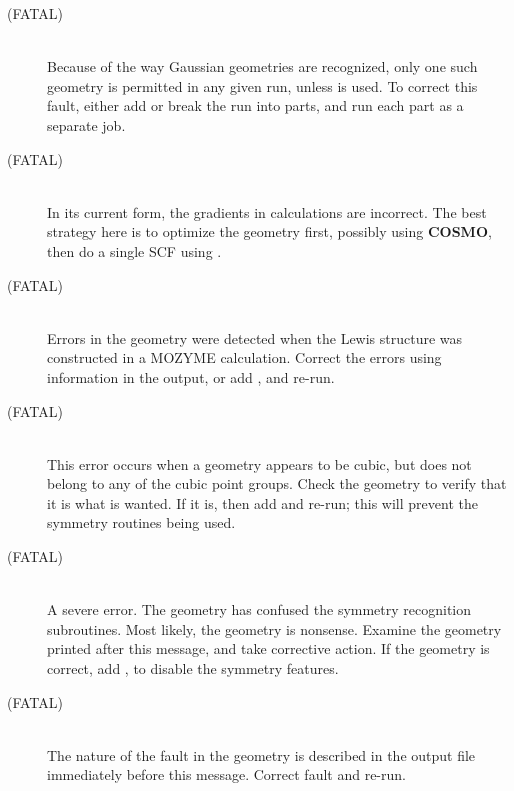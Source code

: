 \begin{description}
\item[ (FATAL)]~\\
Because of the way Gaussian geometries are recognized, only one such geometry
is permitted in any given run, unless  is used.  To correct this
fault, either add  or break the run into parts, and run each part as
a separate job.


\item[ (FATAL)]~\\
In its current form, the gradients in  calculations are incorrect. 
The best strategy here is to optimize the geometry first, possibly using {\bf
COSMO}, then do a single SCF using .


\item[ (FATAL)]~\\
Errors in the geometry were detected when the Lewis structure was constructed
in a MOZYME calculation.  Correct the errors using information in the output,
or add ,  and re-run.

\item[ (FATAL)]~\\
This error occurs when a geometry appears to be cubic, but does not belong  to
any of the cubic point groups.  Check the geometry to verify that it is what is
wanted.  If it is, then add  and re-run; this will prevent the 
symmetry routines being used.

\item[ (FATAL)]~\\
A severe error.  The geometry has confused the symmetry recognition
subroutines. Most likely, the geometry is nonsense.  Examine the geometry
printed after this message, and take corrective action.  If the geometry is
correct, add , to disable the symmetry features.

\item[ (FATAL)]~\\
The nature of the fault in the geometry is described in the output file
immediately before this message.  Correct fault and re-run.



\end{description}
